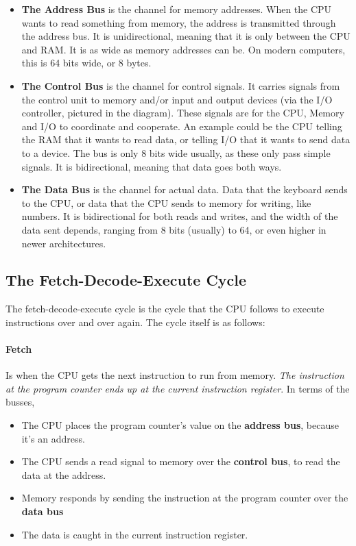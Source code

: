 \documentclass[../main.tex]{subfiles}
\begin{document}
\begin{itemize}
    \item \textbf{The Address Bus} is the channel for memory addresses. When the CPU wants to read something from memory, the address is transmitted through the address bus. It is unidirectional, meaning that it is only between the CPU and RAM. It is as wide as memory addresses can be. On modern computers, this is 64 bits wide, or 8 bytes.
    \item \textbf{The Control Bus} is the channel for control signals. It carries signals from the control unit to memory and/or input and output devices (via the I/O controller, pictured in the diagram). These signals are for the CPU, Memory and I/O to coordinate and cooperate. An example could be the CPU telling the RAM that it wants to read data, or telling I/O that it wants to send data to a device. The bus is only 8 bits wide usually, as these only pass simple signals. It is bidirectional, meaning that data goes both ways.
    \item \textbf{The Data Bus} is the channel for actual data. Data that the keyboard sends to the CPU, or data that the CPU sends to memory for writing, like numbers. It is bidirectional for both reads and writes, and the width of the data sent depends, ranging from 8 bits (usually) to 64, or even higher in newer architectures.
\end{itemize}

\subsection{The Fetch-Decode-Execute Cycle}

The fetch-decode-execute cycle is the cycle that the CPU follows to execute instructions over and over again. The cycle itself is as follows:

\paragraph{Fetch}

Is when the CPU gets the next instruction to run from memory. \emph{The instruction at the program counter ends up at the current instruction register}. In terms of the busses,

\begin{itemize}
    \item The CPU places the program counter's value on the \textbf{address bus}, because it's an address.
    \item The CPU sends a read signal to memory over the \textbf{control bus}, to read the data at the address.
    \item Memory responds by sending the instruction at the program counter over the \textbf{data bus}
    \item The data is caught in the current instruction register.
\end{itemize}
\end{document}
